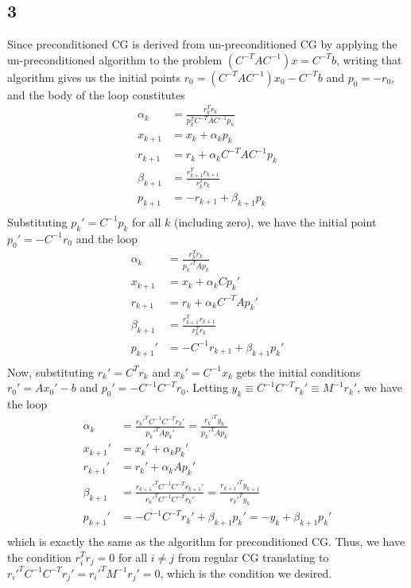 \documentclass{article}
\begin{document}
\subsection*{3}
Since preconditioned CG is derived from un-preconditioned CG by applying the un-preconditioned algorithm to the problem $(C^{-T}AC^{-1})x=C^{-T}b$, writing that algorithm gives us the initial points $r_0=(C^{-T}AC^{-1})x_0-C^{-T}b$ and $p_0=-r_0$, and the body of the loop constitutes
\begin{align*}
    \alpha_k&=\frac{r_k^Tr_k}{p_k^TC^{-T}AC^{-1}p_k}\\
    x_{k+1}&=x_k+\alpha_kp_k\\
    r_{k+1}&=r_k+\alpha_kC^{-T}AC^{-1}p_k\\
    \beta_{k+1}&=\frac{r_{k+1}^Tr_{k+1}}{r_k^Tr_k}\\
    p_{k+1}&=-r_{k+1}+\beta_{k+1}p_k\\
\end{align*}
Substituting $p_k'=C^{-1}p_k$ for all $k$ (including zero), we have the initial point $p_0'=-C^{-1}r_0$ and the loop
\begin{align*}
    \alpha_k&=\frac{r_k^Tr_k}{p_k'^TAp_k}\\
    x_{k+1}&=x_k+\alpha_kCp_k'\\
    r_{k+1}&=r_k+\alpha_kC^{-T}Ap_k'\\
    \beta_{k+1}&=\frac{r_{k+1}^Tr_{k+1}}{r_k^Tr_k}\\
    p_{k+1}'&=-C^{-1}r_{k+1}+\beta_{k+1}p_k'\\
\end{align*}
Now, substituting $r_k'=C^Tr_k$ and $x_k'=C^{-1}x_k$ gets the initial conditions $r_0'=Ax_0'-b$ and $p_0'=-C^{-1}C^{-T}r_0$. Letting $y_k\equiv C^{-1}C^{-T}r_k'\equiv M^{-1}r_k'$, we have the loop
\begin{align*}
    \alpha_k&=\frac{r_k'^TC^{-1}C^{-T}r_k'}{p_k'^TAp_k'}=\frac{r_k'^Ty_k}{p_k'^TAp_k}\\
    x_{k+1}'&=x_k'+\alpha_kp_k'\\
    r_{k+1}'&=r_k'+\alpha_kAp_k'\\
    \beta_{k+1}&=\frac{r_{k+1}'^TC^{-1}C^{-T}r_{k+1}'}{r_k'^TC^{-1}C^{-T}r_k'}=\frac{r_{k+1}'^Ty_{k+1}}{r_k'^Ty_k}\\
    p_{k+1}'&=-C^{-1}C^{-T}r_k'+\beta_{k+1}p_k'=-y_k+\beta_{k+1}p_k'\\
\end{align*}
which is exactly the same as the algorithm for preconditioned CG. Thus, we have the condition $r_i^Tr_j=0$ for all $i\neq j$ from regular CG translating to $r_i'^TC^{-1}C^{-T}r_j'=r_i'^TM^{-1}r_j'=0$, which is the condition we desired.
\end{document}
